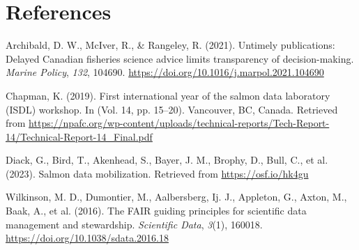 \documentclass[
]{agujournal2019}
\newlength{\cslhangindent}
\newenvironment{CSLReferences}[2] %
 {\begin{list}{}{%
  \setlength{\itemindent}{0pt}
  \setlength{\leftmargin}{0pt}
  \setlength{\parsep}{0pt}
  \ifodd #1
   \setlength{\leftmargin}{\cslhangindent}
   \setlength{\itemindent}{-1\cslhangindent}
  \fi
  \setlength{\itemsep}{#2\baselineskip}}}
 {\end{list}}
\begin{document}
\section{References}\label{references}

\label{refs}
\begin{CSLReferences}{1}{0}
\vspace{1em}

Archibald, D. W., McIver, R., \& Rangeley, R. (2021). Untimely
publications: Delayed Canadian fisheries science advice limits
transparency of decision-making. \emph{Marine Policy}, \emph{132},
104690. \url{https://doi.org/10.1016/j.marpol.2021.104690}

Chapman, K. (2019). First international year of the salmon data
laboratory (ISDL) workshop. In (Vol. 14, pp. 15--20). Vancouver, BC,
Canada. Retrieved from
\url{https://npafc.org/wp-content/uploads/technical-reports/Tech-Report-14/Technical-Report-14_Final.pdf}

Diack, G., Bird, T., Akenhead, S., Bayer, J. M., Brophy, D., Bull, C.,
et al. (2023). Salmon data mobilization. Retrieved from
\url{https://osf.io/hk4gu}

Wilkinson, M. D., Dumontier, M., Aalbersberg, Ij. J., Appleton, G.,
Axton, M., Baak, A., et al. (2016). The FAIR guiding principles for
scientific data management and stewardship. \emph{Scientific Data},
\emph{3}(1), 160018. \url{https://doi.org/10.1038/sdata.2016.18}

\end{CSLReferences}
\end{document}
